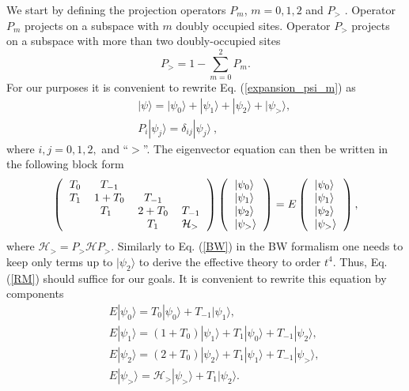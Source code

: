 \documentclass[floatfix,twocolumn,aps,prb,showpacs,superscriptaddress]{revtex4}
\begin{document}
We start by defining the projection operators $P_{m}$, $m=0,1,2$ and $P_{>}$%
. Operator $P_{m}$ projects on a subspace with $m$ doubly occupied sites.
Operator $P_{>}$ projects on a subspace with more than two doubly-occupied
sites
\begin{equation}
P_{>}=1-\sum_{m=0}^{2}P_{m}.
\end{equation}%
For our purposes it is convenient to rewrite Eq. (\ref{expansion_psi_m}) as
\begin{eqnarray}
&&|\psi \rangle =|\psi _{0}\rangle +|\psi _{1}\rangle +|\psi _{2}\rangle
+|\psi _{>}\rangle ,  \nonumber \\
&&P_{i}|\psi _{j}\rangle =\delta _{ij}|\psi _{j}\rangle \ ,
\end{eqnarray}%
where $i,j=0,1,2,$ and ``$>$''. The eigenvector equation can then be written in the
following block form
\begin{equation}
\left( 
\begin{tabular}{llll}
$T_{0}$ & $\;\;T_{-1}$ &  &  \\ 
$T_{1}$ & $1+T_{0}$ & $\;\;T_{-1}$ &  \\ 
& $\;\;T_{1}$ & $2+T_{0}$ & $T_{-1}$ \\ 
&  & $\;\;\;T_{1}$ & $\mathcal{H}_{>}$%
\end{tabular}%
\right) \left( 
\begin{tabular}{l}
$|\psi _{0}\rangle $ \\ 
$|\psi _{1}\rangle $ \\ 
$|\psi _{2}\rangle $ \\ 
$|\psi _{>}\rangle $%
\end{tabular}%
\right) =E\left( 
\begin{tabular}{l}
$|\psi _{0}\rangle $ \\ 
$|\psi _{1}\rangle $ \\ 
$|\psi _{2}\rangle $ \\ 
$|\psi _{>}\rangle $%
\end{tabular}%
\right) ,  \label{RM}
\end{equation}%
where $\mathcal{H}_{>}=P_{>}\mathcal{H}P_{>}$. Similarly to Eq. (\ref{BW})
in the BW formalism one needs to keep only terms up to $|\psi _{2}\rangle $
to derive the effective theory to order $t^{4}$. Thus, Eq. (\ref{RM}) should
suffice for our goals. It is convenient to rewrite this equation by
components 
\begin{eqnarray}
&&E|\psi _{0}\rangle =T_{0}|\psi _{0}\rangle +T_{-1}|\psi _{1}\rangle ,
\label{psi0r} \\
&&E|\psi _{1}\rangle =(1+T_{0})|\psi _{1}\rangle +T_{1}|\psi _{0}\rangle
+T_{-1}|\psi _{2}\rangle ,  \label{psi1r} \\
&&E|\psi _{2}\rangle =(2+T_{0})|\psi _{2}\rangle +T_{1}|\psi _{1}\rangle
+T_{-1}|\psi _{>}\rangle ,  \label{psi2r} \\
&&E|\psi _{>}\rangle =\mathcal{H}_{>}|\psi _{>}\rangle +T_{1}|\psi
_{2}\rangle .  \label{psi>r}
\end{eqnarray}%
\end{document}
